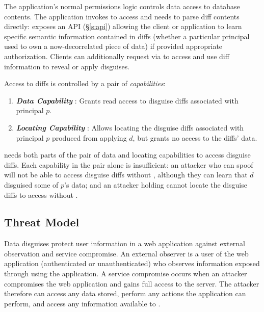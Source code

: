 The application's normal permissions logic controls data access to database contents. The
application invokes \sys to access and needs to parse diff contents directly: \sys exposes an API
(\S\ref{s:api}) allowing the client or application to learn specific semantic information contained
in diffs (\eg whether a particular principal used to own a now-decorrelated piece of data) if
provided appropriate authorization. Clients can additionally request via \sys to access and use diff
information to reveal or apply disguises.

\vspace{6pt}\noindent
Access to diffs is controlled by a pair of \emph{capabilities}:
\begin{enumerate}
    \item \emph{\textbf{Data Capability }}: Grants read access to disguise diffs 
        associated with principal $p$.
    \item \emph{\textbf{Locating Capability }}: Allows locating the disguise
        diffs associated with principal $p$ produced from applying $d$, but grants no 
        access to the diffs' data.
\end{enumerate}

\noindent \sys needs both parts of the pair of data and locating capabilities  to access
disguise diffs.  Each capability in the pair alone is insufficient: an attacker who can spoof
 will not be able to access disguise diffs without , although they can learn
that $d$ disguised some of $p$'s data; and an attacker holding  cannot locate the disguise
diffs to access without .

\subsection{Threat Model}
\label{s:threat}

%
Data disguises protect user information in a web application against external observation
and service compromise.
%
An external observer is a user of the web application (authenticated or unauthenticated) who
observes information exposed through using the application.
%
A service compromise occurs when an attacker compromises the web application and 
gains full access to the server.
%
The attacker therefore can access any data stored, perform any actions the application can
perform, and access any information available to \sys.
%

